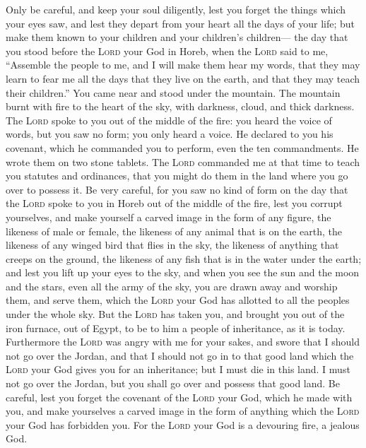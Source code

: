  Only be careful, and keep your soul diligently, lest you
forget the things which your eyes saw, and lest they depart from your
heart all the days of your life; but make them known to your children
and your children's children---  the day that you stood
before the \textsc{Lord} your God in Horeb, when the \textsc{Lord} said
to me, ``Assemble the people to me, and I will make them hear my words,
that they may learn to fear me all the days that they live on the earth,
and that they may teach their children.''  You came near
and stood under the mountain. The mountain burnt with fire to the heart
of the sky, with darkness, cloud, and thick darkness. 
The \textsc{Lord} spoke to you out of the middle of the fire: you heard
the voice of words, but you saw no form; you only heard a voice.
 He declared to you his covenant, which he commanded you
to perform, even the ten commandments. He wrote them on two stone
tablets.  The \textsc{Lord} commanded me at that time to
teach you statutes and ordinances, that you might do them in the land
where you go over to possess it.  Be very careful, for
you saw no kind of form on the day that the \textsc{Lord} spoke to you
in Horeb out of the middle of the fire,  lest you corrupt
yourselves, and make yourself a carved image in the form of any figure,
the likeness of male or female,  the likeness of any
animal that is on the earth, the likeness of any winged bird that flies
in the sky,  the likeness of anything that creeps on the
ground, the likeness of any fish that is in the water under the earth;
 and lest you lift up your eyes to the sky, and when you
see the sun and the moon and the stars, even all the army of the sky,
you are drawn away and worship them, and serve them, which the
\textsc{Lord} your God has allotted to all the peoples under the whole
sky.  But the \textsc{Lord} has taken you, and brought
you out of the iron furnace, out of Egypt, to be to him a people of
inheritance, as it is today.  Furthermore the
\textsc{Lord} was angry with me for your sakes, and swore that I should
not go over the Jordan, and that I should not go in to that good land
which the \textsc{Lord} your God gives you for an inheritance;
 but I must die in this land. I must not go over the
Jordan, but you shall go over and possess that good land.
 Be careful, lest you forget the covenant of the
\textsc{Lord} your God, which he made with you, and make yourselves a
carved image in the form of anything which the \textsc{Lord} your God
has forbidden you.  For the \textsc{Lord} your God is a
devouring fire, a jealous God.

